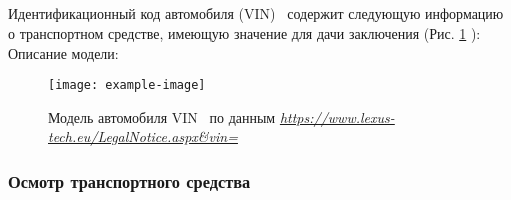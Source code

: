 \subparagraph*{} Идентификационный код автомобиля (VIN)  \vin \, содержит следующую информацию о транспортном средстве, имеющую значение для 	дачи заключения (Рис. \ref{fig:vin} ):\\[3mm]
%	
%					
%	
	

Описание модели:
	\begin{figure}[H]
		\centering
		\texttt{[image: example-image]}
		\caption[]{{\footnotesize Модель  автомобиля VIN \vin\, по данным\textit{ \url{https://www.lexus-tech.eu/LegalNotice.aspx\&vin=}}} }
		\label{fig:vin}
	\end{figure}
	
\vspace{3mm}
%
%


	\subsubsection{Осмотр транспортного средства}
	
